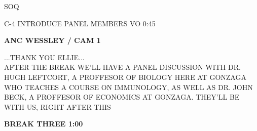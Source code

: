 \documentclass{article}
\newenvironment{changemargin}[2]{%
\begin{list}{}{%
\setlength{\topsep}{0pt}%
\setlength{\leftmargin}{#1}%
\setlength{\rightmargin}{#2}%
\setlength{\listparindent}{\parindent}%
\setlength{\itemindent}{\parindent}%
\setlength{\parsep}{\parskip}%
}%
\item[]}{\end{list}}
\begin{document}
\begin{flushleft}
\begin{changemargin}{-3cm}{-5cm}
\begin{changemargin}{-3cm}{-5cm}
\color{red}
SOQ

\end{changemargin}

\end{changemargin}
\vspace{8.5mm}

\begin{changemargin}{-3cm}{-5cm}
\color{red}
C-4  INTRODUCE PANEL MEMBERS    VO  0:45

\color{black}

\textbf{
ANC WESSLEY / CAM 1}
\end{changemargin}


\begin{changemargin}{4cm}{1cm}
...THANK YOU ELLIE...\\
AFTER THE BREAK WE'LL HAVE A PANEL DISCUSSION WITH DR. HUGH LEFTCORT, A PROFFESOR OF BIOLOGY HERE AT GONZAGA WHO TEACHES A COURSE ON IMMUNOLOGY, AS WELL AS DR. JOHN BECK, A PROFFESOR OF ECONOMICS AT GONZAGA.
THEY'LL BE WITH US, RIGHT AFTER THIS

\end{changemargin}



\begin{changemargin}{4cm}{1cm}
\color{blue}
\textbf{BREAK THREE 1:00}
\end{changemargin}











\end{flushleft}
\end{document}

